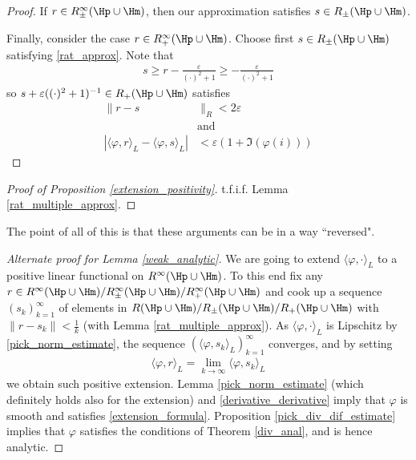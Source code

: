 \begin{proof}
	If $r \in R^{\infty}_{\pm}(\Hp \cup \Hm)$, then our approximation satisfies $s \in R_{\pm}(\Hp \cup \Hm)$.

	Finally, consider the case $r \in R^{\infty}_{+}(\Hp \cup \Hm)$. Choose first $s \in R_{\pm}(\Hp \cup \Hm)$ satisfying \ref{rat_approx}. Note that
	\begin{align*}
		s \geq r - \frac{\varepsilon}{(\cdot)^2 + 1} \geq -\frac{\varepsilon}{(\cdot)^2 + 1}
	\end{align*}
	so $s + \varepsilon ((\cdot)^2 + 1)^{-1} \in R_{+}(\Hp \cup \Hm)$ satisfies
	\begin{align*}
		\|r - s&\|_{R} < 2\varepsilon \nonumber\\
		&\text{and } \\
		|\langle \varphi, r\rangle_{L} -  \langle \varphi, s\rangle_{L}|& < \varepsilon (1 + \Im(\varphi(i)))
	\end{align*}
\end{proof}

\begin{proof}[Proof of Proposition \ref{extension_positivity}]
	t.f.i.f. Lemma \ref{rat_multiple_approx}.
\end{proof}

The point of all of this is that these arguments can be in a way ``reversed".

\begin{proof}[Alternate proof for Lemma \ref{weak_analytic}]
	We are going to extend $\langle \varphi, \cdot\rangle_{L}$ to a positive linear functional on $R^{\infty}(\Hp \cup \Hm)$. To this end fix any $r \in R^{\infty}(\Hp \cup \Hm)/R^{\infty}_{\pm}(\Hp \cup \Hm)/R^{\infty}_{+}(\Hp \cup \Hm)$ and cook up a sequence $(s_{k})_{k = 1}^{\infty}$ of elements in $R(\Hp \cup \Hm)/R_{\pm}(\Hp \cup \Hm)/R_{+}(\Hp \cup \Hm)$ with $\|r - s_{k}\| < \frac{1}{k}$ (with Lemma \ref{rat_multiple_approx}). As $\langle \varphi, \cdot\rangle_{L}$ is Lipschitz by \ref{pick_norm_estimate}, the sequence $(\langle \varphi, s_{k} \rangle_{L})_{k = 1}^{\infty}$ converges, and by setting
	\begin{align*}
		\langle \varphi, r\rangle_{L} = \lim_{k \to \infty} \langle \varphi, s_{k}\rangle_{L}
	\end{align*}
	we obtain such positive extension. Lemma \ref{pick_norm_estimate} (which definitely holds also for the extension) and \ref{derivative_derivative} imply that $\varphi$ is smooth and satisfies \ref{extension_formula}. Proposition \ref{pick_div_dif_estimate} implies that $\varphi$ satisfies the conditions of Theorem \ref{div_anal}, and is hence analytic.
\end{proof}

